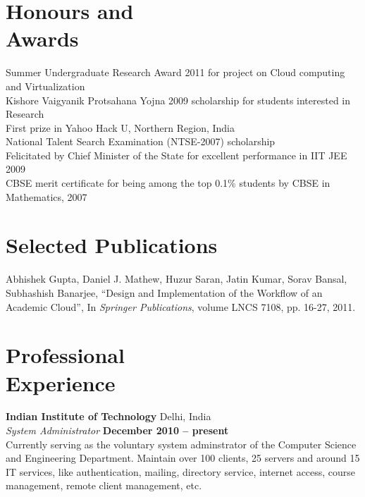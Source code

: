 \documentclass[margin,line]{resume}
\begin{document}
\begin{resume}
    \section{\mysidestyle Honours and\\Awards} 
    Summer Undergraduate Research Award 2011 for project on Cloud computing and Virtualization \vspace{1mm}\\%
    Kishore Vaigyanik Protsahana Yojna 2009 scholarship for students interested in Research\vspace{1mm}\\%
    First prize in Yahoo Hack U, Northern Region, India\vspace{1mm}\\%
    National Talent Search Examination (NTSE-2007) scholarship\vspace{1mm}\\%
    Felicitated by Chief Minister of the State for excellent performance in IIT JEE 2009 \vspace{1mm}\\%
    CBSE merit certificate for being among the top 0.1\% students by CBSE in Mathematics, 2007
    \section{\mysidestyle Selected Publications}

\vspace{-2mm}
    Abhishek Gupta, Daniel J. Mathew, Huzur Saran, Jatin Kumar, Sorav Bansal, Subhashish Banarjee, ``Design and Implementation of the Workflow of an Academic Cloud'',
    In \textsl{Springer Publications}, volume LNCS 7108, pp. 16-27, 2011.

    \section{\mysidestyle Professional\\Experience}

    \textbf{Indian Institute of Technology} Delhi, India\vspace{1mm}\\\vspace{1mm}%
    \textsl{System Administrator} \hfill \textbf{December 2010 -- present}\\
    Currently serving as the voluntary system adminstrator of the Computer Science and Engineering Department. Maintain over 100 clients, 25 servers and around 15 IT services, like authentication, mailing, directory service, internet access, course management, remote client management, etc.


\end{resume}
\end{document}
